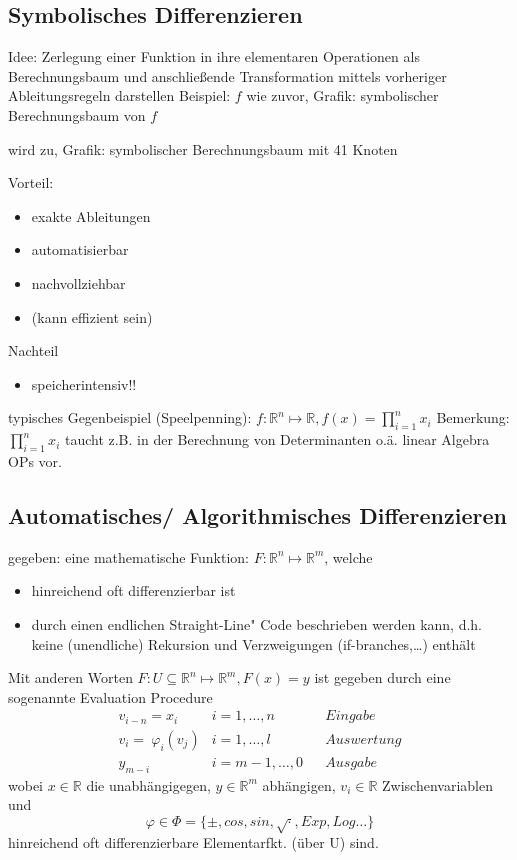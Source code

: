 \vspace{3cm}
\subsection{Symbolisches Differenzieren}
Idee: Zerlegung einer Funktion in ihre elementaren Operationen als Berechnungsbaum und anschließende Transformation mittels vorheriger Ableitungsregeln darstellen
Beispiel: $f$ wie zuvor, Grafik: symbolischer Berechnungsbaum von $f$

\vspace{8cm}

wird zu, Grafik:  symbolischer Berechnungsbaum mit 41 Knoten

\vspace{10cm}

Vorteil:
\begin{itemize}
	\item exakte Ableitungen
	\item automatisierbar
	\item nachvollziehbar
	\item (kann effizient sein)
\end{itemize}
Nachteil
\begin{itemize}
	\item speicherintensiv!!
\end{itemize}
typisches Gegenbeispiel (Speelpenning):
$f:\mathbb{R}^n\mapsto\mathbb{R}, f(x) = \prod_{i=1}^n x_i$
Bemerkung: $\prod_{i=1}^n x_i$ taucht z.B. in der Berechnung von Determinanten o.ä. linear Algebra OPs vor.

\subsection{Automatisches/ Algorithmisches Differenzieren}

gegeben: eine mathematische Funktion: $F:\mathbb{R}^n\mapsto\mathbb{R}^m$, welche
\begin{itemize}
	\item hinreichend oft differenzierbar ist
	\item durch einen endlichen \glqq Straight-Line" Code beschrieben werden kann, d.h. keine (unendliche) Rekursion und Verzweigungen (if-branches,\dots) enthält
\end{itemize}
Mit anderen Worten $F:U\subseteq \mathbb{R}^n\mapsto\mathbb{R}^m, F(x) = y$ ist gegeben durch eine sogenannte Evaluation Procedure
\begin{align*}
	v_{i-n}= x_i & i = 1,\dots,n && Eingabe\\
	v_i = \ \varphi_i(v_j) & i = 1,\dots,l && Auswertung\\
	y_{m-i}& i = m-1,\dots,0 && Ausgabe
\end{align*}
wobei $x \in \mathbb{R}$ die unabhängigegen, $y \in \mathbb{R}^m$ abhängigen, $v_i \in \mathbb{R}$ Zwischenvariablen und 
$$\varphi \in \Phi = \{\pm, cos, sin, \sqrt{\cdot}, Exp, Log \dots \}$$
hinreichend oft differenzierbare Elementarfkt. (über U) sind.

